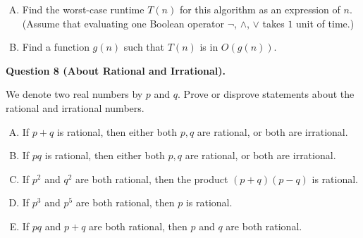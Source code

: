\documentclass[jou]{apa6}
\begin{document}
\begin{enumerate}[(A)]
\item Find the worst-case runtime $T(n)$ for this algorithm as an expression of $n$.
(Assume that evaluating one Boolean operator $\neg$, $\wedge$, $\vee$ takes $1$ unit of time.)
\item Find a function $g(n)$ such that $T(n)$ is in $O(g(n))$. 
\end{enumerate}




\vspace{10pt}
{\bf Question 8 (About Rational and Irrational).}

We denote two real numbers by $p$ and $q$. 
Prove or disprove statements about the rational and irrational numbers. 

\begin{enumerate}[(A)]
\item If $p + q$ is rational, then either both $p,q$ are rational, or both are irrational. 
\item If $pq$ is rational, then either both $p,q$ are rational, or both are irrational. 
\item If $p^2$ and $q^2$ are both rational, then the product $(p+q)(p-q)$ is rational. 
\item If $p^3$ and $p^5$ are both rational, then $p$ is rational.
\item If $pq$ and $p+q$ are both rational, then $p$ and $q$ are both rational.
\end{enumerate}
\end{document}
